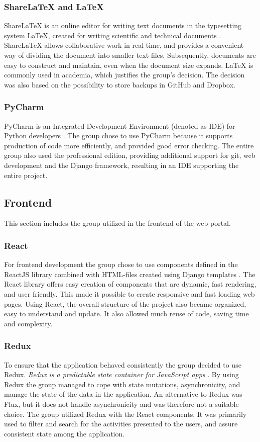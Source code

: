 \subsubsection{ShareLaTeX and LaTeX}
ShareLaTeX is an online editor for writing text documents in the typesetting system LaTeX, created for writing scientific and technical documents \cite{ShareLatex}. ShareLaTeX allows collaborative work in real time, and provides a convenient way of dividing the document into smaller text files. Subsequently, documents are easy to construct and maintain, even when the document size expands. LaTeX is commonly used in academia, which justifies the group's decision. The decision was also based on the possibility to store backups in GitHub and Dropbox.
  
\subsubsection{PyCharm}
PyCharm is an Integrated Development Environment (denoted as IDE) for Python developers \cite{PyCharm}. The group chose to use PyCharm because it supports production of code more efficiently, and provided good error checking. The entire group also used the professional edition, providing additional support for git, web development and the Django framework, resulting in an IDE supporting the entire project.

\subsection{Frontend}
\label{frontEnd}
This section includes the group utilized in the frontend of the web portal.

\subsubsection{React}
For frontend development the group chose to use components defined in the ReactJS library combined with HTML-files created using Django templates \cite{React}. The React library offers easy creation of components that are dynamic, fast rendering, and user friendly. This made it possible to create responsive and fast loading web pages. Using React, the overall structure of the project also became organized, easy to understand and update. It also allowed much reuse of code, saving time and complexity. 

\subsubsection{Redux}
\label{redux}
To ensure that the application behaved consistently the group decided to use Redux. \textit{Redux is a predictable state container for JavaScript apps} \cite{Redux}. By using Redux the group managed to cope with state mutations, asynchronicity, and manage the state of the data in the application. An alternative to Redux was Flux, but it does not handle asynchronicity and was therefore not a suitable choice. The group utilized Redux with the React components. It was primarily used to filter and search for the activities presented to the users, and assure consistent state among the application.  

